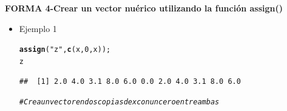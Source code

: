 \documentclass[12pt,letterpaper]{article}\usepackage[]{graphicx}\usepackage[]{color}
\makeatletter
\newcommand{\hlnum}[1]{\textcolor[rgb]{0.686,0.059,0.569}{#1}}%
\newcommand{\hlstr}[1]{\textcolor[rgb]{0.192,0.494,0.8}{#1}}%
\newcommand{\hlcom}[1]{\textcolor[rgb]{0.678,0.584,0.686}{\textit{#1}}}%
\newcommand{\hlstd}[1]{\textcolor[rgb]{0.345,0.345,0.345}{#1}}%
\newcommand{\hlkwd}[1]{\textcolor[rgb]{0.737,0.353,0.396}{\textbf{#1}}}%
\newenvironment{kframe}{%
 \def\at@end@of@kframe{}%
 \ifinner\ifhmode%
  \def\at@end@of@kframe{\end{minipage}}%
  \begin{minipage}{\columnwidth}%
 \fi\fi%
 \def\FrameCommand##1{\hskip\@totalleftmargin \hskip-\fboxsep
 \colorbox{shadecolor}{##1}\hskip-\fboxsep
     \hskip-\linewidth \hskip-\@totalleftmargin \hskip\columnwidth}%
 \MakeFramed {\advance\hsize-\width
   \@totalleftmargin\z@ \linewidth\hsize
   \@setminipage}}%
 {\par\unskip\endMakeFramed%
 \at@end@of@kframe}
\newenvironment{knitrout}{}{} %
\makeatother
\begin{document}
\textbf{FORMA 4-Crear un vector nu\'erico utilizando la funci\'on assign()}
\begin{itemize}
\item Ejemplo 1
\begin{knitrout}
\color{fgcolor}\begin{kframe}
\begin{alltt}
\hlkwd{assign}\hlstd{(}\hlstr{"z"}\hlstd{,} \hlkwd{c}\hlstd{(x,} \hlnum{0}\hlstd{, x));}
\hlstd{z}
\end{alltt}
\begin{verbatim}
##  [1] 2.0 4.0 3.1 8.0 6.0 0.0 2.0 4.0 3.1 8.0 6.0
\end{verbatim}
\begin{alltt}
\hlcom{# Crea un vector en dos copias de x con un cero entre ambas}
\end{alltt}
\end{kframe}
\end{knitrout}
\end{itemize}

\newpage
\end{document}
